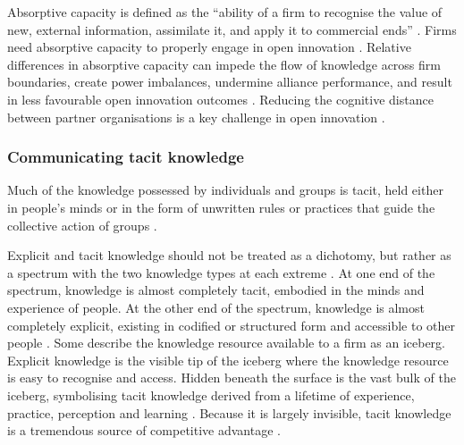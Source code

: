 Absorptive capacity is defined as the \enquote{ability of a firm to recognise the value of new, external information, assimilate it, and apply it to commercial ends} \citep{cohen1990absorptive}. Firms need absorptive capacity to properly engage in open innovation \citep{vanhaverbeke2007connecting}. Relative differences in absorptive capacity can impede the flow of knowledge across firm boundaries, create power imbalances, undermine alliance performance, and result in less favourable open innovation outcomes \citep{szulanski1996exploring,lane1998relative,nooteboom2000learning,vanhaverbeke2007connecting,easterby2008absorptive,phelps2012knowledge}. Reducing the cognitive distance between partner organisations is a key challenge in open innovation \citep{nooteboom2000learning,vanhaverbeke2007connecting}. \medskip

\subsubsection{Communicating tacit knowledge}

Much of the knowledge possessed by individuals and groups is tacit, held either in people's minds or in the form of unwritten rules or practices that guide the collective action of groups \citep{mowery1996strategic,leonard1998role,burt2007secondhand,goksel2016can,lichtenthaler2016absorptive}. \medskip

Explicit and tacit knowledge should not be treated as a dichotomy, but rather as a spectrum with the two knowledge types at each extreme \citep{polanyi1966tacit,inkpen1998knowledge,cavusgil2003tacit}. At one end of the spectrum, knowledge is almost completely tacit, embodied in the minds and experience of people. At the other end of the spectrum, knowledge is almost completely explicit, existing in codified or structured form and accessible to other people \citep{leonard1998role}. Some describe the knowledge resource available to a firm as an iceberg. Explicit knowledge is the visible tip of the iceberg where the knowledge resource is easy to recognise and access. Hidden beneath the surface is the vast bulk of the iceberg, symbolising tacit knowledge derived from a lifetime of experience, practice, perception and learning \citep{haldin2000difficulties,mcadam2007exploring,rebernik2007fostering}. Because it is largely invisible, tacit knowledge is a tremendous source of competitive advantage \citep{nelson1982evolutionary,barney1991firm,grant1996toward,smith2001role,chilton2007dimensions,lu2015job}.\medskip

